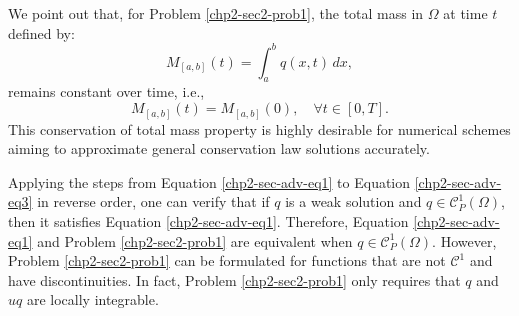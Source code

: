 We point out that, for Problem \ref{chp2-sec2-prob1}, the total mass in $\Omega$ at time $t$ defined by:
\begin{equation*}
{M}_{[a,b]}(t) = \int_{a}^{b} q(x,t) \,dx,
\end{equation*}
remains constant over time, i.e.,
\begin{equation*}
	{M}_{[a,b]}(t) = {M}_{[a,b]}(0), \quad \forall t \in [0,T].
\end{equation*}
This conservation of total mass property is highly desirable for numerical schemes aiming
to approximate general conservation law solutions accurately.

Applying the steps from Equation \eqref{chp2-sec-adv-eq1} to Equation \eqref{chp2-sec-adv-eq3} in reverse order,
one can verify that if ${q}$ is a weak solution and $q \in \mathcal{C}^1_P{(\Omega)}$, then it satisfies Equation \eqref{chp2-sec-adv-eq1}.
Therefore, Equation \eqref{chp2-sec-adv-eq1} and Problem \eqref{chp2-sec2-prob1} are equivalent when $q \in \mathcal{C}^1_P{(\Omega)}$.
However, Problem \eqref{chp2-sec2-prob1} can be formulated for functions that are not $\mathcal{C}^1$ and have discontinuities.
In fact, Problem \eqref{chp2-sec2-prob1} only requires that $q$ and $uq$ are locally integrable.

